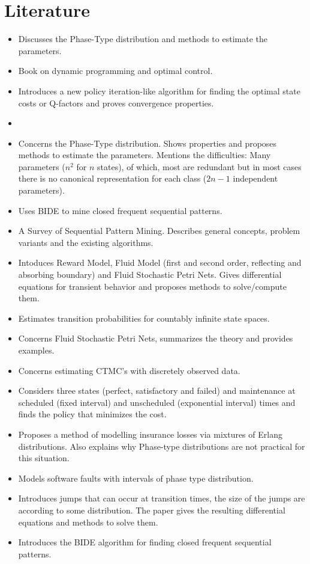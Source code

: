 \section{Literature}
\begin{itemize}
\item \citep{Asmussen1996} Discusses the Phase-Type distribution and methods to estimate the parameters.
\item \citep{Bertsekas1995} Book on dynamic programming and optimal control.
\item \citep{Bertsekas2012} Introduces a new policy iteration-like
algorithm for finding the optimal state costs or Q-factors and proves convergence properties.
\item \citep{Birge2011}
\item \citep{Buchholz2014} Concerns the Phase-Type distribution. Shows properties and proposes methods to estimate the parameters. Mentions the difficulties: Many parameters ($n^2$ for $n$ states), of which, most are redundant but in most cases there is no canonical representation for each class ($2n-1$ independent parameters).
\item \citep{Chen2014} Uses BIDE to mine closed frequent sequential patterns.
\item \citep{Fournier-Viger2017} A Survey of Sequential Pattern Mining. Describes general concepts, problem variants and the existing algorithms.
\item \citep{Gribaudo2007} Intoduces Reward Model, Fluid Model (first and second order, reflecting and absorbing boundary) and Fluid Stochastic Petri Nets. Gives differential equations for transient behavior and proposes methods to solve/compute them.
\item\citep{Hajiaghayi2014} Estimates transition probabilities for countably infinite state spaces.
\item \citep{Horton1998} Concerns Fluid Stochastic Petri Nets, summarizes the theory and provides examples.
\item\citep{Inamura2006} Concerns estimating CTMC's with discretely observed data.
\item \citep{Kalosi2016} Considers three states (perfect, satisfactory and failed) and maintenance at scheduled (fixed interval) and unscheduled (exponential interval) times and finds the policy that minimizes the cost.
\item \citep{Lee2010} Proposes a method of modelling insurance losses via mixtures of Erlang distributions. Also explains why Phase-type distributions are not practical for this situation.
\item \citep{Okamura2006} Models software faults with intervals of phase type distribution.
\item\citep{Tzenova2005} Introduces jumps that can occur at transition times, the size of the jumps are according to some distribution. The paper gives the resulting differential equations and methods to solve them.
\item\citep{Wang2004} Introduces the BIDE algorithm for finding closed frequent sequential patterns.

\end{itemize}
